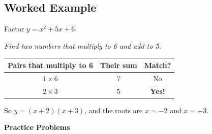 \documentclass[12pt]{article}
\begin{document}
\subsection*{Worked Example}

Factor $y = x^2 + 5x + 6$.

\textit{Find two numbers that multiply to 6 and add to 5.}

\medskip
\begin{center}
\begin{tabular}{c|c|c}
\textbf{Pairs that multiply to 6} & \textbf{Their sum} & \textbf{Match?}\\
\hline
$1 \times 6$ & $7$ & No\\
$2 \times 3$ & $5$ & \textbf{Yes!}\\
\end{tabular}
\end{center}

\medskip
So $y = (x + 2)(x + 3)$, and the roots are $x = -2$ and $x = -3$.

\bigskip
\textbf{Practice Problems}
\end{document}
